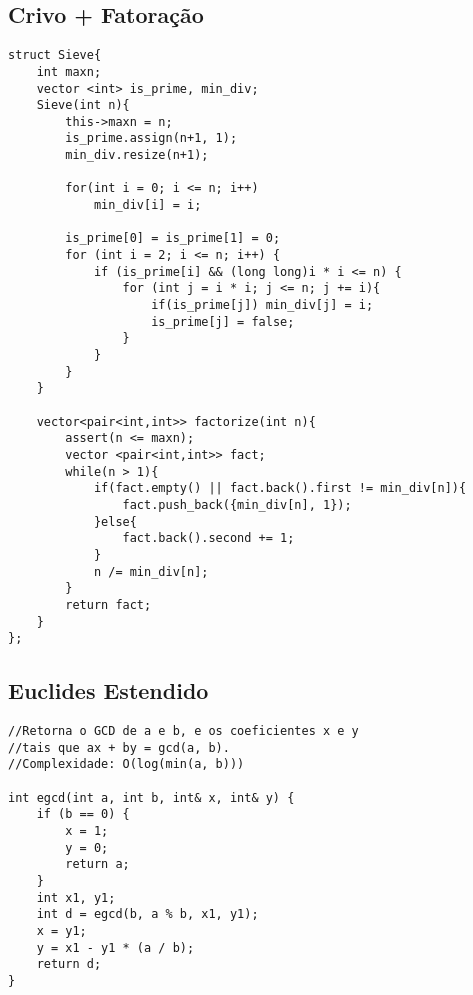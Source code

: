 \documentclass[11pt, a4paper, twoside]{article}
\begin{document}
\subsection{Crivo + Fatoração}
\begin{verbatim}
struct Sieve{
    int maxn;
    vector <int> is_prime, min_div;
    Sieve(int n){
        this->maxn = n;
        is_prime.assign(n+1, 1);
        min_div.resize(n+1);
    
        for(int i = 0; i <= n; i++)
            min_div[i] = i;
    
        is_prime[0] = is_prime[1] = 0;
        for (int i = 2; i <= n; i++) {
            if (is_prime[i] && (long long)i * i <= n) {
                for (int j = i * i; j <= n; j += i){
                    if(is_prime[j]) min_div[j] = i;
                    is_prime[j] = false;
                }
            }
        }
    }
    
    vector<pair<int,int>> factorize(int n){
        assert(n <= maxn);
        vector <pair<int,int>> fact;
        while(n > 1){
            if(fact.empty() || fact.back().first != min_div[n]){
                fact.push_back({min_div[n], 1});
            }else{
                fact.back().second += 1;
            }
            n /= min_div[n];
        }
        return fact;
    }
};
\end{verbatim}

\subsection{Euclides Estendido}
\begin{verbatim}
//Retorna o GCD de a e b, e os coeficientes x e y
//tais que ax + by = gcd(a, b).
//Complexidade: O(log(min(a, b)))

int egcd(int a, int b, int& x, int& y) {
    if (b == 0) {
        x = 1;
        y = 0;
        return a;
    }
    int x1, y1;
    int d = egcd(b, a % b, x1, y1);
    x = y1;
    y = x1 - y1 * (a / b);
    return d;
}
\end{verbatim}
\end{document}
